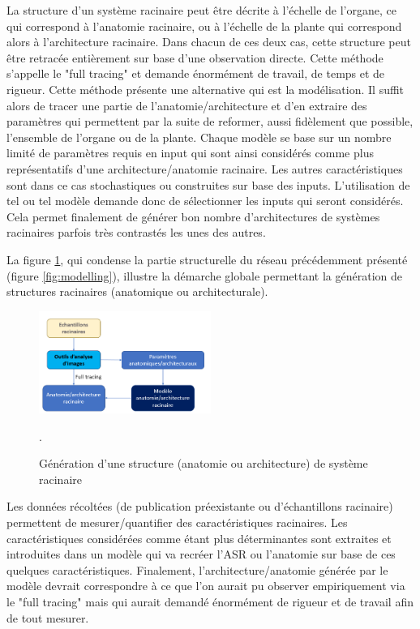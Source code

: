 La structure d'un système racinaire peut être décrite à l'échelle de l'organe, ce qui correspond à l'anatomie racinaire, ou à l'échelle de la plante qui correspond alors à l'architecture racinaire.
Dans chacun de ces deux cas, cette structure peut être retracée entièrement sur base d'une observation directe.
Cette méthode s'appelle le "full tracing" et demande énormément de travail, de temps et de rigueur.
Cette méthode présente une alternative qui est la modélisation.
Il suffit alors de tracer une partie de l'anatomie/architecture et d'en extraire des paramètres qui permettent par la suite de reformer, aussi fidèlement que possible, l'ensemble de l'organe ou de la plante.
Chaque modèle se base sur un nombre limité de paramètres requis en input qui sont ainsi considérés comme plus représentatifs d'une architecture/anatomie racinaire.
Les autres caractéristiques sont dans ce cas stochastiques ou construites sur base des inputs.
L'utilisation de tel ou tel modèle demande donc de sélectionner les inputs qui seront considérés.
Cela permet finalement de générer bon nombre d'architectures de systèmes racinaires parfois très contrastés les unes des autres.
\newline

La figure \ref{fig:structure generation}, qui condense la partie structurelle du réseau précédemment présenté (figure \ref{fig:modelling}), illustre la démarche globale permettant la génération de structures racinaires (anatomique ou architecturale).

\begin{figure}[ht]
\centering
\includegraphics[width=0.5\textwidth]{Image/structure generation.png}
\caption{Génération d'une structure (anatomie ou architecture) de système racinaire}.
\label{fig:structure generation}
\end{figure}

Les données récoltées (de publication préexistante ou d'échantillons racinaire) permettent de mesurer/quantifier des caractéristiques racinaires.
Les caractéristiques considérées comme étant plus déterminantes sont extraites et introduites dans un modèle qui va recréer l'ASR ou l'anatomie sur base de ces quelques caractéristiques.
Finalement, l'architecture/anatomie générée par le modèle devrait correspondre à ce que l'on aurait pu observer empiriquement via le "full tracing" mais qui aurait demandé énormément de rigueur et de travail afin de tout mesurer.

